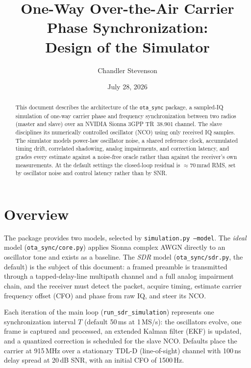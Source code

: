 \documentclass[10pt]{article}
\title{One-Way Over-the-Air Carrier Phase Synchronization:\\
Design of the \code{ota\_sync} Simulator}
\author{Chandler Stevenson}
\date{July 28, 2026}
\newcommand{\code}[1]{\texttt{#1}}
\begin{document}
\maketitle

\begin{abstract}
\noindent
This document describes the architecture of the \code{ota\_sync} package, a
sampled-IQ simulation of one-way carrier phase and frequency synchronization
between two radios (master and slave) over an NVIDIA Sionna 3GPP TR~38.901
channel. The slave disciplines its numerically controlled oscillator (NCO)
using only received IQ samples. The simulator models power-law oscillator
noise, a shared reference clock, accumulated timing drift, correlated
shadowing, analog impairments, and correction latency, and grades every
estimate against a noise-free oracle rather than against the receiver's own
measurements. At the default settings the closed-loop residual is
$\approx 70$\,mrad RMS, set by oscillator noise and control latency rather
than by SNR.
\end{abstract}

\section{Overview}
The package provides two models, selected by \code{simulation.py --model}.
The \emph{ideal} model (\code{ota\_sync/core.py}) applies Sionna complex AWGN
directly to an oscillator tone and exists as a baseline. The \emph{SDR} model
(\code{ota\_sync/sdr.py}, the default) is the subject of this document: a
framed preamble is transmitted through a tapped-delay-line multipath channel
and a full analog impairment chain, and the receiver must detect the packet,
acquire timing, estimate carrier frequency offset (CFO) and phase from raw
IQ, and steer its NCO.

Each iteration of the main loop (\code{run\_sdr\_simulation}) represents one
synchronization interval $T$ (default 50\,ms at 1\,MS/s): the oscillators
evolve, one frame is captured and processed, an extended Kalman filter (EKF)
is updated, and a quantized correction is scheduled for the slave NCO.
Defaults place the carrier at 915\,MHz over a stationary TDL-D (line-of-sight)
channel with 100\,ns delay spread at 20\,dB SNR, with an initial CFO of
1500\,Hz.
\end{document}
